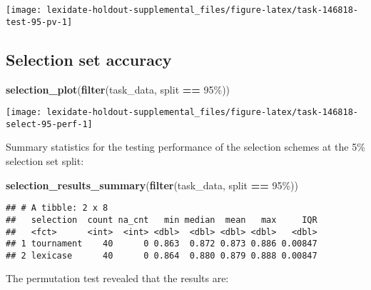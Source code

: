 \documentclass[
]{book}
\newenvironment{Shaded}{\begin{snugshade}}{\end{snugshade}}
\newcommand{\FunctionTok}[1]{\textcolor[rgb]{0.13,0.29,0.53}{\textbf{#1}}}
\newcommand{\NormalTok}[1]{#1}
\newcommand{\SpecialCharTok}[1]{\textcolor[rgb]{0.81,0.36,0.00}{\textbf{#1}}}
\newcommand{\StringTok}[1]{\textcolor[rgb]{0.31,0.60,0.02}{#1}}
\begin{document}
\texttt{[image: lexidate-holdout-supplemental\_files/figure-latex/task-146818-test-95-pv-1]}

\hypertarget{selection-set-accuracy-4}{%
\subsection{Selection set accuracy}\label{selection-set-accuracy-4}}

\begin{Shaded}
\begin{Highlighting}[]
\FunctionTok{selection\_plot}\NormalTok{(}\FunctionTok{filter}\NormalTok{(task\_data, split }\SpecialCharTok{==} \StringTok{\textquotesingle{}95\%\textquotesingle{}}\NormalTok{))}
\end{Highlighting}
\end{Shaded}

\texttt{[image: lexidate-holdout-supplemental\_files/figure-latex/task-146818-select-95-perf-1]}

Summary statistics for the testing performance of the selection schemes at the 5\% selection set split:

\begin{Shaded}
\begin{Highlighting}[]
\FunctionTok{selection\_results\_summary}\NormalTok{(}\FunctionTok{filter}\NormalTok{(task\_data, split }\SpecialCharTok{==} \StringTok{\textquotesingle{}95\%\textquotesingle{}}\NormalTok{))}
\end{Highlighting}
\end{Shaded}

\begin{verbatim}
## # A tibble: 2 x 8
##   selection  count na_cnt   min median  mean   max     IQR
##   <fct>      <int>  <int> <dbl>  <dbl> <dbl> <dbl>   <dbl>
## 1 tournament    40      0 0.863  0.872 0.873 0.886 0.00847
## 2 lexicase      40      0 0.864  0.880 0.879 0.888 0.00847
\end{verbatim}

The permutation test revealed that the results are:
\end{document}
